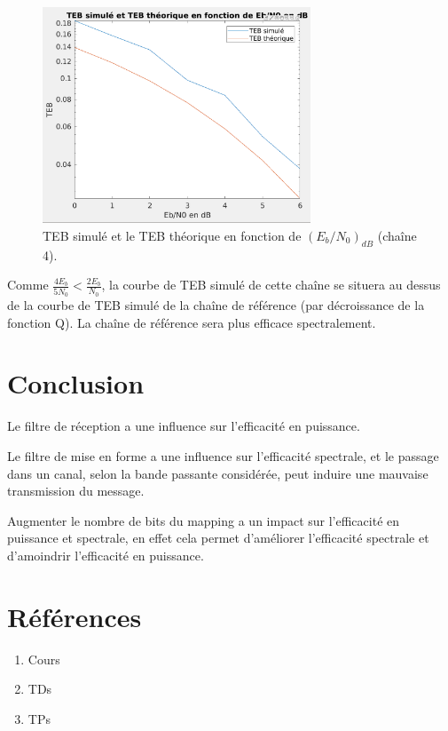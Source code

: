 \documentclass[frenchb]{article}
\begin{document}
\begin{enumerate}
        \begin{figure}[ht!]
		\centering
		\includegraphics[width=8cm]{C4F32.png}		              	    \caption{TEB simulé et le TEB théorique en fonction de $\left(E_b/N_0\right)_{dB}$ (chaîne 4). \label{fig : C4F32}}
		\end{figure}
    \end{enumerate}
    
    Comme $\frac{4 E_b}{5 N_0} < \frac{2 E_b}{N_0}$, la courbe de TEB simulé de cette chaîne se situera au dessus de la courbe de TEB simulé de la chaîne de référence (par décroissance de la fonction Q). La chaîne de référence sera plus efficace spectralement. 

\section{Conclusion}
Le filtre de réception a une influence sur l'efficacité en puissance.

Le filtre de mise en forme a une influence sur l'efficacité spectrale, et le passage dans un canal, selon la bande passante considérée, peut induire une mauvaise transmission du message.

Augmenter le nombre de bits du mapping a un impact sur l'efficacité en puissance et spectrale, en effet cela permet d'améliorer l'efficacité spectrale et d'amoindrir l'efficacité en puissance. 

\section{Références}
\begin{enumerate}
	\item Cours
	\item TDs
	\item TPs
\end{enumerate}
\end{document}
